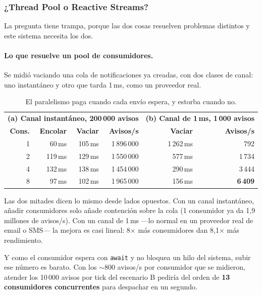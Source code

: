 \subsubsection{¿Thread Pool o Reactive Streams?}

La pregunta tiene trampa, porque las dos cosas resuelven problemas distintos y este sistema
necesita los dos.

\paragraph{Lo que resuelve un pool de consumidores.}
Se midió vaciando una cola de notificaciones ya creadas, con dos clases de canal: uno
instantáneo y otro que tarda 1\,ms, como un proveedor real.

\begin{table}[H]
\centering
\small
\begin{tabular}{rrrr|rr}
\toprule
\multicolumn{4}{c|}{\textbf{(a) Canal instantáneo, 200\,000 avisos}} & \multicolumn{2}{c}{\textbf{(b) Canal de 1\,ms, 1\,000 avisos}} \\
\textbf{Cons.} & \textbf{Encolar} & \textbf{Vaciar} & \textbf{Avisos/s} & \textbf{Vaciar} & \textbf{Avisos/s} \\
\midrule
1 & 60\,ms & 105\,ms & 1\,896\,000 & 1\,262\,ms & 792 \\
2 & 119\,ms & 129\,ms & 1\,550\,000 & 577\,ms & 1\,734 \\
4 & 132\,ms & 138\,ms & 1\,454\,000 & 290\,ms & 3\,444 \\
8 & 97\,ms & 102\,ms & 1\,965\,000 & 156\,ms & \textbf{6\,409} \\
\bottomrule
\end{tabular}
\caption{El paralelismo paga cuando cada envío espera, y estorba cuando no.}
\end{table}

Las dos mitades dicen lo mismo desde lados opuestos. Con un canal instantáneo, añadir
consumidores solo añade contención sobre la cola (1 consumidor ya da 1,9 millones de
avisos/s). Con un canal de 1\,ms ---lo normal en un proveedor real de email o SMS--- la
mejora es casi lineal: 8$\times$ más consumidores dan 8,1$\times$ más rendimiento.

Y como el consumidor espera con \texttt{await} y no bloquea un hilo del sistema, subir ese
número es barato. Con los $\sim$800 avisos/s por consumidor que se midieron, atender los
10\,000 avisos por tick del escenario B pediría del orden de \textbf{13 consumidores
concurrentes} para despachar en un segundo.

